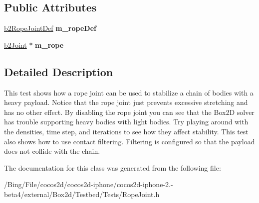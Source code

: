 \subsection*{Public Attributes}
\begin{DoxyCompactItemize}
\item 
\hypertarget{class_rope_joint_af7f74f6644564606df1ea0f0d0a679f6}{\hyperlink{structb2_rope_joint_def}{b2\-Rope\-Joint\-Def} {\bfseries m\-\_\-rope\-Def}}\label{class_rope_joint_af7f74f6644564606df1ea0f0d0a679f6}

\item 
\hypertarget{class_rope_joint_a0a24afb4453b5ae06e56d750316cc5ee}{\hyperlink{classb2_joint}{b2\-Joint} $\ast$ {\bfseries m\-\_\-rope}}\label{class_rope_joint_a0a24afb4453b5ae06e56d750316cc5ee}

\end{DoxyCompactItemize}


\subsection{Detailed Description}
This test shows how a rope joint can be used to stabilize a chain of bodies with a heavy payload. Notice that the rope joint just prevents excessive stretching and has no other effect. By disabling the rope joint you can see that the Box2\-D solver has trouble supporting heavy bodies with light bodies. Try playing around with the densities, time step, and iterations to see how they affect stability. This test also shows how to use contact filtering. Filtering is configured so that the payload does not collide with the chain. 

The documentation for this class was generated from the following file\-:\begin{DoxyCompactItemize}
\item 
/\-Bing/\-File/cocos2d/cocos2d-\/iphone/cocos2d-\/iphone-\/2.-\/beta4/external/\-Box2d/\-Testbed/\-Tests/Rope\-Joint.\-h\end{DoxyCompactItemize}
